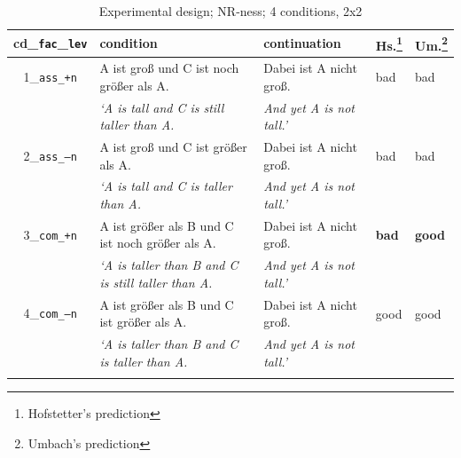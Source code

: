 \documentclass[output=paper,
modfonts
]{langscibook}
\begin{document}
\begin{table}[H]\scriptsize
\begin{tabular}{cllll}
\lsptoprule
cd\_\texttt{fac}\_\texttt{lev} & condition & continuation & Hs.\footnote{ Hofstetter's prediction} & Um.\footnote{ Umbach's prediction} \\
\midrule  
1\_\texttt{ass\_\footnotesize{+}n} & A ist groß \hspace{25pt} und C ist noch größer als A. & Dabei ist A nicht groß. & bad &  bad \\
 & \textit{`A is tall \hspace{32pt} and C is \hspace{0.4pt} still \hspace{2pt} taller than A.} & \textit{And yet A is not tall.'} & & \\
\midrule
2\_\texttt{ass\_\footnotesize{--}n} & A ist groß \hspace{25pt} und C ist \hspace{16pt} größer als A. & Dabei ist A nicht groß. & bad & bad \\
 & \textit{`A is tall \hspace{32pt} and C is \hspace{19pt} taller than A.} & \textit{And yet A is not tall.'} & & \\
\midrule 
3\_\texttt{com\_\footnotesize{+}n} & A ist größer als B \hspace{0.65pt} und C ist noch größer als A. & Dabei ist A nicht groß. & \textbf{bad} & \textbf{good} \\
 & \textit{`A is taller than B \hspace{2pt} and C is \hspace{0.4pt} still \hspace{2pt} taller than A.} & \textit{And yet A is not tall.'} & & \\
\midrule
4\_\texttt{com\_\footnotesize{--}n} & A ist größer als B \hspace{0.65pt} und C ist \hspace{16pt} größer als A. & Dabei ist A nicht groß. & good & good \\
 & \textit{`A is taller than B \hspace{2pt} and C is \hspace{19pt} taller than A.} & \textit{And yet A is not tall.'} & & \\
\lspbottomrule
\end{tabular}
\caption{Experimental design; NR-ness; 4 conditions, 2x2}
\label{tab:4_conds_material}
\end{table}
\end{document}
